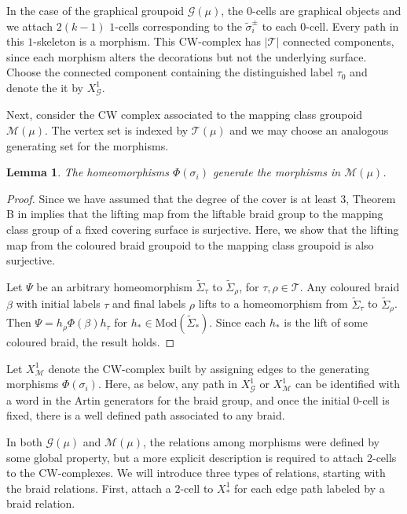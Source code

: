 \documentclass{amsart}
\newtheorem{lemma}[theorem]{Lemma}
\theoremstyle{definition}
\def\ws{\widetilde{\Sigma}}
\begin{document}
In the case of the graphical groupoid $\mathcal{G}(\mu)$, the $0$-cells are graphical objects and we attach $2(k-1)$ $1$-cells corresponding to the $\widetilde{\sigma}_i^\pm$ to each $0$-cell.  Every path in this $1$-skeleton is a morphism.   This CW-complex has $|\mathcal{T}|$  connected components, since each morphism alters the decorations but not the underlying surface.  Choose the connected component containing the distinguished label $\tau_0$ and denote the it by $X^1_\mathcal{G}$.  

Next, consider the CW complex associated to the mapping class groupoid $\mathcal{M}(\mu)$.  The vertex set is indexed by $\mathcal{T}(\mu)$ and we may choose an analogous generating set for the morphisms.  

\begin{lemma} The homeomorphisms $\Phi(\sigma_i)$ generate the morphisms in $\mathcal{M}(\mu)$.  
\end{lemma}

\begin{proof} Since we have assumed that the degree of the cover is at least $3$, Theorem B in \cite{MAM} implies that the lifting map from the liftable braid group to the mapping class group of a fixed covering surface is surjective.  Here, we show that the lifting map from the coloured braid groupoid to the mapping class groupoid is also surjective.  

Let $\Psi$ be an arbitrary homeomorphism $\ws_\tau$ to $\ws_\rho$, for $\tau, \rho\in \mathcal{T}$.  Any coloured braid $\beta$ with initial labels $\tau$ and final labels $\rho$ lifts to a homeomorphism from  $\ws_\tau$ to $\ws_\rho$.  Then $\Psi=h_\rho \Phi(\beta) h_\tau$ for $h_*\in \text{Mod}(\ws_*)$.  Since each $h_*$ is the lift of some coloured braid, the result holds.  
\end{proof}

Let $X^1_\mathcal{M}$ denote the CW-complex built by assigning edges to the generating morphisms $\Phi(\sigma_i)$.  Here, as below, any path in $X^1_\mathcal{G}$ or $X^1_\mathcal{M}$ can be identified with a word in the Artin generators for the braid group, and once the initial $0$-cell is fixed, there is a well defined path associated to any braid. 

In both $\mathcal{G}(\mu)$ and $\mathcal{M}(\mu)$, the relations among morphisms  were defined by some global property, but  a more explicit description is required to attach $2$-cells to the CW-complexes.  We will introduce three types of relations, starting with the braid relations.  First, attach a $2$-cell to $X^1_*$ for each edge path labeled by a braid relation.  
\end{document}
